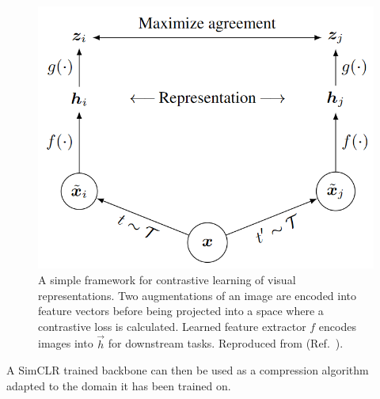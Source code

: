 \begin{figure}
    \centering
    \includegraphics[width=\linewidth]{pediatric-brain-tumours/images/simclr.png}
    \caption[SimCLR]{
        A simple framework for contrastive learning of visual representations.
        Two augmentations of an image are encoded into feature vectors before being projected into a space where a contrastive loss is calculated.
        Learned feature extractor $f$ encodes images into $\vec{h}$ for downstream tasks.
        Reproduced from  (Ref.~\cite{Chen2020}).
    }
    \label{fig:simclr}
\end{figure}

A SimCLR trained backbone can then be used as a compression algorithm adapted to the domain it has been trained on.
